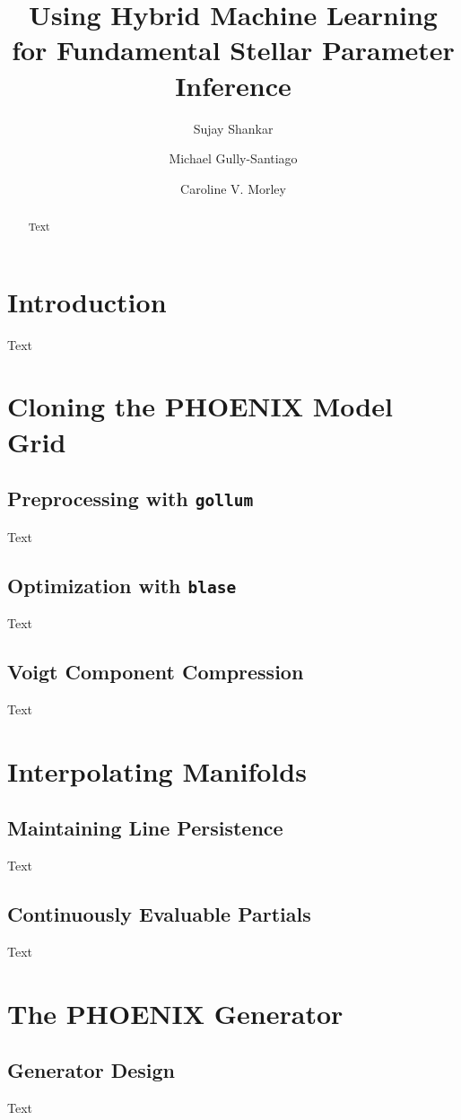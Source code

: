 \documentclass[twocolumn]{aastex631}
\begin{document}
\title{Using Hybrid Machine Learning for Fundamental Stellar Parameter Inference}
\author[0000-0002-2290-6810]{Sujay Shankar}
\author[0000-0002-4020-3457]{Michael Gully-Santiago}
\author[0000-0002-4404-0456]{Caroline V. Morley}

\begin{abstract}
    Text
\end{abstract}

\section{Introduction}
Text

\section{Cloning the PHOENIX Model Grid}
\subsection{Preprocessing with \texttt{gollum}}
Text
\subsection{Optimization with \texttt{blase}}
Text
\subsection{Voigt Component Compression}
Text

\section{Interpolating Manifolds}
\subsection{Maintaining Line Persistence}
Text
\subsection{Continuously Evaluable Partials}
Text

\section{The PHOENIX Generator}
\subsection{Generator Design}
Text
\end{document}
